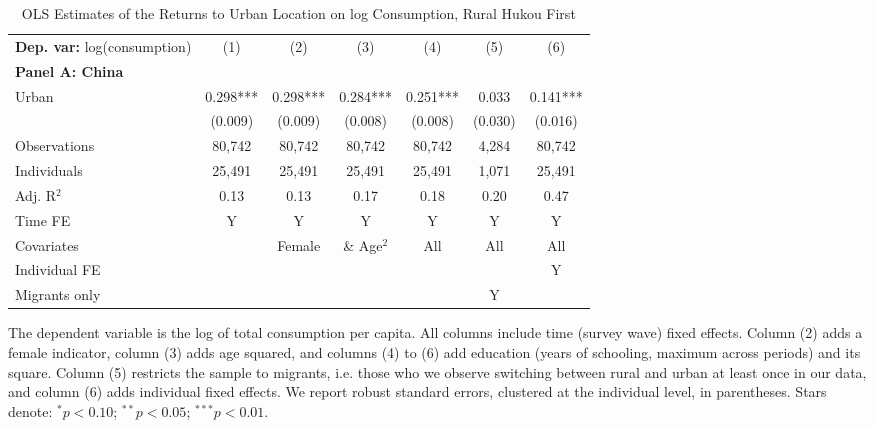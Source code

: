 \begin{table}[htbp] \centering \begin{threeparttable}
 \caption{OLS Estimates of the Returns to Urban Location on log Consumption, Rural Hukou First} 
 \label{tab:OLS_CHN_hukou_rural_first_consumption_urban_unb} 
\begin{tabular}{l cccccc} \toprule  \textbf{Dep. var:}  log(consumption) 
                    &\multicolumn{1}{c}{(1)}   &\multicolumn{1}{c}{(2)}   &\multicolumn{1}{c}{(3)}   &\multicolumn{1}{c}{(4)}   &\multicolumn{1}{c}{(5)}   &\multicolumn{1}{c}{(6)}   \\
\textbf{Panel A: China} \\
Urban               &       0.298***&       0.298***&       0.284***&       0.251***&       0.033   &       0.141***\\
                    &     (0.009)   &     (0.009)   &     (0.008)   &     (0.008)   &     (0.030)   &     (0.016)   \\
\addlinespace
Observations        &      80,742   &      80,742   &      80,742   &      80,742   &       4,284   &      80,742   \\
Individuals         &      25,491   &      25,491   &      25,491   &      25,491   &       1,071   &      25,491   \\
Adj. R$^{2}$        &        0.13   &        0.13   &        0.17   &        0.18   &        0.20   &        0.47   \\
\cmidrule{2 -7} Time FE & Y & Y & Y & Y & Y & Y \\ Covariates & & Female & \& Age$^2$ & All & All & All \\ Individual FE & & & & & & Y \\ Migrants only & & & & & Y & \\ \bottomrule \end{tabular} \begin{tablenotes}[flushleft] \footnotesize \item{The dependent variable is the log of total consumption per capita. All columns include time (survey wave) fixed effects. Column (2) adds a female indicator, column (3) adds age squared, and columns (4) to (6) add education (years of schooling, maximum across periods) and its square. Column (5) restricts the sample to migrants, i.e. those who we observe switching between rural and urban at least once in our data, and column (6) adds individual fixed effects. We report robust standard errors, clustered at the individual level, in parentheses. Stars denote: $^{*} p<0.10$; $^{**} p<0.05$; $^{***} p<0.01$.} \end{tablenotes} \end{threeparttable} \end{table}
